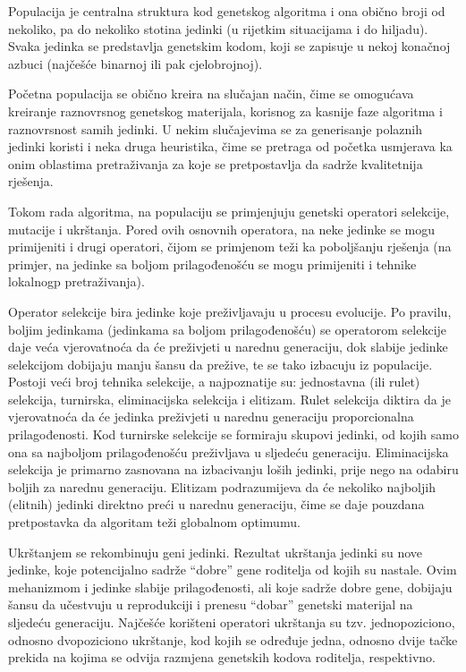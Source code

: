 \documentclass[a4paper, utf8, 11pt, colorlinks]{book}
\begin{document}
Populacija je centralna struktura kod genetskog algoritma i ona  obično broji od nekoliko, pa do nekoliko stotina jedinki (u rijetkim situacijama i do hiljadu). Svaka jedinka se predstavlja genetskim kodom, koji se zapisuje u nekoj konačnoj azbuci (najčešće binarnoj ili pak cjelobrojnoj).


Početna populacija se obično kreira na slučajan način, čime se omogućava kreiranje raznovrsnog genetskog materijala, korisnog za kasnije faze algoritma i raznovrsnost samih jedinki. U nekim slučajevima se za generisanje polaznih jedinki koristi i neka druga heuristika, čime se pretraga od početka usmjerava ka onim oblastima pretraživanja za koje se pretpostavlja da sadrže kvalitetnija rješenja.

Tokom rada algoritma, na populaciju se primjenjuju genetski operatori selekcije, mutacije i ukrštanja. Pored ovih osnovnih operatora, na neke jedinke se mogu primijeniti i drugi operatori, čijom se primjenom teži ka poboljšanju rješenja (na primjer, na jedinke sa boljom prilagođenošću se mogu primijeniti i tehnike lokalnogp pretraživanja).

Operator selekcije bira jedinke koje preživljavaju u procesu evolucije. Po pravilu, boljim jedinkama (jedinkama sa boljom prilagođenošću) se operatorom selekcije daje veća vjerovatnoća da će preživjeti u narednu generaciju, dok  slabije jedinke selekcijom dobijaju manju šansu da prežive, te se tako izbacuju iz populacije. Postoji veći broj tehnika selekcije, a najpoznatije su: jednostavna (ili rulet) selekcija, turnirska, eliminacijska selekcija i elitizam. Rulet selekcija diktira da je vjerovatnoća da će jedinka preživjeti u narednu generaciju proporcionalna prilagođenosti. Kod turnirske selekcije se formiraju skupovi jedinki, od kojih samo ona sa najboljom prilagođenošću preživljava u sljedeću generaciju. Eliminacijska selekcija je primarno zasnovana na izbacivanju loših jedinki, prije nego na odabiru boljih za narednu generaciju. Elitizam podrazumijeva da će nekoliko najboljih (elitnih) jedinki direktno preći u narednu generaciju, čime se daje pouzdana pretpostavka da  algoritam teži globalnom optimumu.

Ukrštanjem se rekombinuju geni jedinki. Rezultat ukrštanja jedinki su nove jedinke, koje potencijalno sadrže ``dobre'' gene  roditelja od kojih su nastale. Ovim mehanizmom  i jedinke slabije prilagođenosti, ali koje sadrže dobre gene, dobijaju šansu da učestvuju u reprodukciji i prenesu ``dobar'' genetski materijal na sljedeću generaciju. Najčešće korišteni operatori ukrštanja su tzv. jednopoziciono, odnosno dvopoziciono ukrštanje, kod kojih se određuje jedna, odnosno dvije tačke prekida na kojima se odvija razmjena genetskih kodova roditelja, respektivno.
\end{document}
